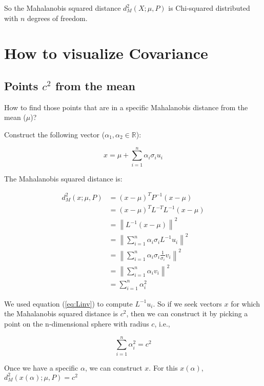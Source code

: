 \documentclass{article}
\newcommand\norm[1]{\left\lVert#1\right\rVert}
\begin{document}
So the Mahalanobis squared distance $d_M^2(X; \mu, P)$ is Chi-squared distributed with $n$ degrees of freedom.


\section{How to visualize Covariance}



\subsection{Points $c^2$ from the mean}

How to find those points that are in a specific Mahalanobis distance from the mean ($\mu$)? 

Construct the following vector ($\alpha_1, \alpha_2 \in \mathbb{R}$):

\begin{equation}
    x = \mu + \sum_{i=1}^{n}\alpha_i \sigma_i u_i
\end{equation}

The Mahalanobis squared distance is:

\begin{equation}
    \begin{split}
        d_M^2(x; \mu, P) &= (x - \mu)^T P^{-1} (x-\mu) \\
        &= (x - \mu)^T L^{-T} L^{-1} (x - \mu) \\
        &= \norm{ L^{-1} (x - \mu) }^2 \\
        &= \norm{ \sum_{i=1}^{n} \alpha_i \sigma_i L^{-1} u_i }^2 \\
        &= \norm{ \sum_{i=1}^{n} \alpha_i \sigma_i \frac{1}{\sigma_i} v_i }^2 \\
        &= \norm{ \sum_{i=1}^{n} \alpha_i v_i }^2 \\
        &= \sum_{i=1}^{n} \alpha_i^2
    \end{split}
\end{equation}

We used equation (\ref{eq:Linv}) to compute $L^{-1}u_i$. So if we seek vectors $x$ for which the Mahalanobis squared distance is $c^2$, then we can construct it by picking a point on the n-dimensional sphere with radius $c$, i.e.,

\begin{equation}
    \sum_{i=1}^{n} \alpha_i^2 = c^2
\end{equation}

Once we have a specific $\alpha$, we can construct $x$. For this $x(\alpha)$, $d_M^2(x(\alpha); \mu, P)=c^2$
\end{document}
